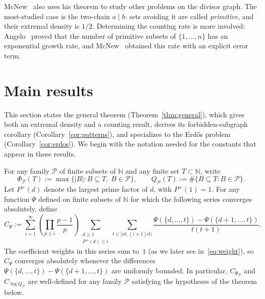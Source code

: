 \documentclass[11pt]{amsart}
\newcommand{\N}{\mathbb{N}}
\begin{document}
McNew~\cite{McNew21} also uses his theorem to study other problems on the divisor graph. The most-studied case is the two-chain \(a\mid b\): sets avoiding it are called \emph{primitive}, and their extremal density is \(1/2\). Determining the counting rate is more involved: Angelo~\cite{Angelo18} proved that the number of primitive subsets of \(\{1,\dots,n\}\) has an exponential growth rate, and McNew~\cite[Theorem~2]{McNew21} obtained this rate with an explicit error term.

\section{Main results}\label{sec:general}

This section states the general theorem (Theorem~\ref{thm:general}), which gives both an extremal density and a counting result, derives its forbidden-subgraph corollary (Corollary~\ref{cor:patterns}), and specializes to the Erd\H{o}s problem (Corollary~\ref{cor:erdos}). We begin with the notation needed for the constants that appear in these results.

For any family \(\mathcal{P}\) of finite subsets of \(\N\) and any finite set \(T\subset\N\), write
\[
\Phi_{\mathcal{P}}(T):=\max\{|B|:B\subseteq T,\;B\in\mathcal{P}\},
\qquad
Q_{\mathcal{P}}(T):=\#\{B\subseteq T:B\in\mathcal{P}\}.
\]
Let \(P^+(d)\) denote the largest prime factor of \(d\), with \(P^+(1)=1\). For any function \(\Psi\) defined on finite subsets of \(\N\) for which the following series converges absolutely, define
\[
C_{\Psi}:=
\sum_{i=1}^{\infty}
\left(\prod_{p\le i}\frac{p-1}{p}\right)
\sum_{\substack{d\ge 1\\ P^+(d)\le i}}
\sum_{t\in[id,(i+1)d)}
\frac{\Psi(\{d,\dots,t\})-\Psi(\{d+1,\dots,t\})}{t(t+1)}.
\]
The coefficient weights in this series sum to~\(1\) (as we later see in~\eqref{eq:weight}), so \(C_\Psi\) converges absolutely whenever the differences \(\Psi(\{d,\dots,t\})-\Psi(\{d+1,\dots,t\})\) are uniformly bounded. In particular, \(C_{\Phi_{\mathcal{P}}}\) and \(C_{\log Q_{\mathcal{P}}}\) are well-defined for any family \(\mathcal{P}\) satisfying the hypotheses of the theorem below.
\end{document}
